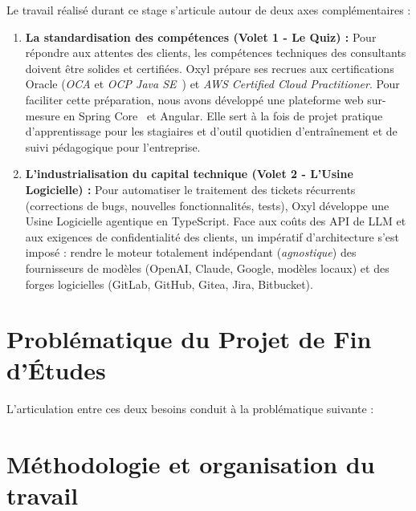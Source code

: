 \documentclass{tnreport}
\begin{document}
Le travail réalisé durant ce stage s'articule autour de deux axes complémentaires :

\begin{enumerate}
    \item \textbf{La standardisation des compétences (Volet 1 - Le Quiz) :} Pour répondre aux attentes des clients, les compétences techniques des consultants doivent être solides et certifiées. Oxyl prépare ses recrues aux certifications Oracle (\textit{OCA} et \textit{OCP Java SE}~\cite{boyarsky2020ocp}) et \textit{AWS Certified Cloud Practitioner}. Pour faciliter cette préparation, nous avons développé une plateforme web sur-mesure en Spring Core~\cite{walls2022spring} et Angular. Elle sert à la fois de projet pratique d'apprentissage pour les stagiaires et d'outil quotidien d'entraînement et de suivi pédagogique pour l'entreprise.
    \item \textbf{L'industrialisation du capital technique (Volet 2 - L'Usine Logicielle) :} Pour automatiser le traitement des tickets récurrents (corrections de bugs, nouvelles fonctionnalités, tests), Oxyl développe une \og Usine Logicielle \fg{} agentique en TypeScript. Face aux coûts des API de LLM et aux exigences de confidentialité des clients, un impératif d'architecture s'est imposé : rendre le moteur totalement indépendant (\textit{agnostique}) des fournisseurs de modèles (OpenAI, Claude, Google, modèles locaux) et des forges logicielles (GitLab, GitHub, Gitea, Jira, Bitbucket).
\end{enumerate}

\section*{Problématique du Projet de Fin d'Études}

L'articulation entre ces deux besoins conduit à la problématique suivante :

\begin{center}
    \setlength{\fboxsep}{10pt}
\end{center}

\section*{Méthodologie et organisation du travail}
\end{document}
